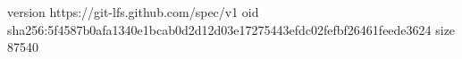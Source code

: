 version https://git-lfs.github.com/spec/v1
oid sha256:5f4587b0afa1340e1bcab0d2d12d03e17275443efdc02fefbf26461feede3624
size 87540
